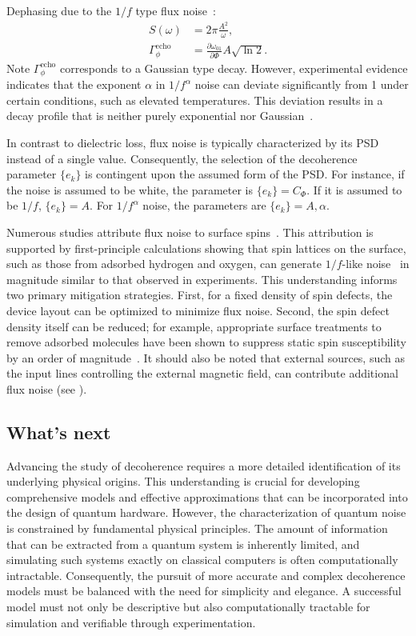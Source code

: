 \documentclass[a4paper,onecolumn,11pt,unpublished]{quantumarticle}
\newcommand{\setelem}[1]{\ensuremath{\{#1\}}}
\begin{document}
Dephasing due to the $1/f$ type flux noise~\cite{Nguyen2020Toward}:
\begin{align}
  S(\omega)                     & = 2\pi \frac{A^2}{\omega}, \label{eq:psd_1f} \\
  \Gamma_{\phi}^{\text{echo}} & = \frac{\partial \omega_{01}}{\partial \Phi} A \sqrt{\ln 2}. \label{eq:tphi_flux_1f_noise_psd}
\end{align}
Note $\Gamma_{\phi}^{\text{echo}}$ corresponds to a Gaussian type decay. However, experimental evidence indicates that the exponent $\alpha$ in $1/f^{\alpha}$ noise can deviate significantly from 1 under certain conditions, such as elevated temperatures\cite{Anton2012Pure}. This deviation results in a decay profile that is neither purely exponential nor Gaussian~\cite{NavaAquino2022Flux,Gao2025The}.

In contrast to dielectric loss, flux noise is typically characterized by its PSD instead of a single value. Consequently, the selection of the decoherence parameter $\setelem{e_k}$ is contingent upon the assumed form of the PSD. For instance, if the noise is assumed to be white, the parameter is $\setelem{e_k}={C_{\Phi}}$. If it is assumed to be $1/f$, $\setelem{e_k}={A}$. For $1/f^{\alpha}$ noise, the parameters are $\setelem{e_k}={A,\alpha}$.

Numerous studies attribute flux noise to surface spins~\cite{Koch2007Model,Braumuller2020Characterizing}. This attribution is supported by first-principle calculations showing that spin lattices on the surface, such as those from adsorbed hydrogen and oxygen, can generate $1/f$-like noise~\cite{Wang2018Hydrogen} in magnitude similar to that observed in experiments. This understanding informs two primary mitigation strategies. First, for a fixed density of spin defects, the device layout can be optimized to minimize flux noise. Second, the spin defect density itself can be reduced; for example, appropriate surface treatments to remove adsorbed molecules have been shown to suppress static spin susceptibility by an order of magnitude~\cite{Kumar2016Origin}. It should also be noted that external sources, such as the input lines controlling the external magnetic field, can contribute additional flux noise (see ).

\subsection{What's next}
Advancing the study of decoherence requires a more detailed identification of its underlying physical origins. This understanding is crucial for developing comprehensive models and effective approximations that can be incorporated into the design of quantum hardware. However, the characterization of quantum noise is constrained by fundamental physical principles. The amount of information that can be extracted from a quantum system is inherently limited, and simulating such systems exactly on classical computers is often computationally intractable. Consequently, the pursuit of more accurate and complex decoherence models must be balanced with the need for simplicity and elegance. A successful model must not only be descriptive but also computationally tractable for simulation and verifiable through experimentation.
\end{document}
